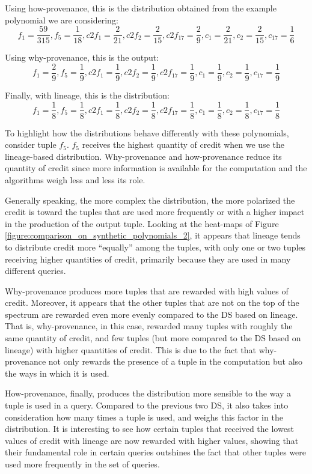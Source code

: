 Using how-provenance, this is the distribution obtained from the example polynomial we are considering:
\[
f_1 = \frac{59}{315}, f_5 = \frac{1}{18}, c2f_1 = \frac{2}{21}, c2f_2 = \frac{2}{15}, 
c2f_{17}=\frac{2}{9} , c_1 = \frac{2}{21}, c_2 = \frac{2}{15}, c_{17} = \frac{1}{6} 
\]

Using why-provenance, this is the output:
\[
f_1 = \frac{2}{9}, f_5 = \frac{1}{9}, c2f_1 = \frac{1}{9}, c2f_2 = \frac{1}{9}, 
c2f_{17}=\frac{1}{9} , c_1 = \frac{1}{9}, c_2 = \frac{1}{9}, c_{17} = \frac{1}{9} 
\]

Finally, with lineage, this is the distribution:
\[
f_1 = \frac{1}{8}, f_5 = \frac{1}{8}, c2f_1 = \frac{1}{8}, c2f_2 = \frac{1}{8}, 
c2f_{17}=\frac{1}{8} , c_1 = \frac{1}{8}, c_2 = \frac{1}{8}, c_{17} = \frac{1}{8} 
\]

To highlight how the distributions behave differently with these polynomials, consider tuple $f_5$.
$f_5$ receives the highest quantity of credit when we use the lineage-based distribution. Why-provenance and how-provenance reduce its quantity of credit since more information is available for the computation and the algorithms weigh less and less its role. 

Generally speaking, the more complex the distribution, the more polarized the credit is toward the tuples that are used more frequently or with a higher impact in the production of the output tuple. 
Looking at the heat-maps of Figure \ref{figure:comparison_on_synthetic_polynomials_2}, it appears that lineage tends to distribute credit more ``equally'' among the tuples, with only one or two tuples receiving higher quantities of credit, primarily because they are used in many different queries. 

Why-provenance produces more tuples that are rewarded with high values of credit. Moreover, it appears that the other tuples that are not on the top of the spectrum are rewarded even more evenly compared to the DS based on lineage. That is, why-provenance, in this case, rewarded many tuples with roughly the same quantity of credit, and few tuples (but more compared to the DS based on lineage) with higher quantities of credit.
This is due to the fact that why-provenance not only rewards the presence of a tuple in the computation but also the ways in which it is used.

How-provenance, finally, produces the distribution more sensible to the way a tuple is used in a query. Compared to the previous two DS, it also takes into consideration how many times a tuple is used, and weighs this factor in the distribution. It is interesting to see how certain tuples that received the lowest values of credit with lineage are now rewarded with higher values, showing that their fundamental role in certain queries outshines the fact that other tuples were used more frequently in the set of queries.

